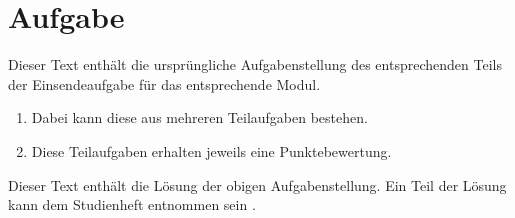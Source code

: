 \chapter{Aufgabe}
\label{ch:01_task}

\begin{universityTask}
    Dieser Text enthält die ursprüngliche Aufgabenstellung des entsprechenden Teils der Einsendeaufgabe für das entsprechende Modul.

    \begin{enumerate}[label=(\alph*)]
    \item Dabei kann diese aus mehreren Teilaufgaben bestehen.
    \item Diese Teilaufgaben erhalten jeweils eine Punktebewertung.
    \end{enumerate}
\end{universityTask}

Dieser Text enthält die Lösung der obigen Aufgabenstellung. 
Ein Teil der Lösung kann dem Studienheft entnommen sein \cite{000_ABCDE01_official-study-book}.

